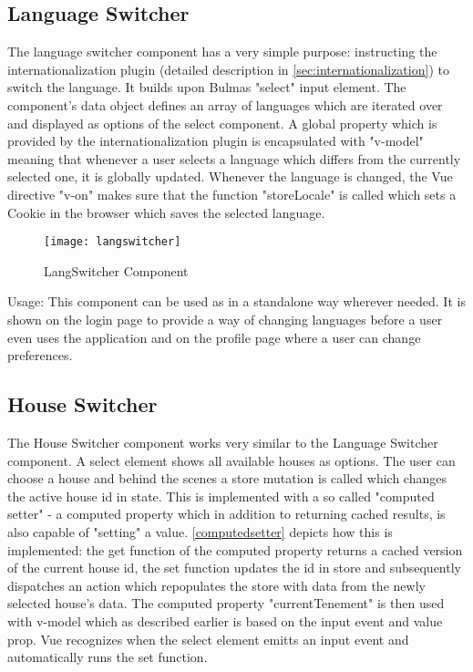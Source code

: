 \subsection{Language Switcher} \label{langswitcher}
The language switcher component has a very simple purpose: instructing the internationalization plugin (detailed description in \autoref{sec:internationalization}) to switch the language. It builds upon Bulmas "select" input element. The component's data object defines an array of languages which are iterated over and displayed as options of the select component. A global property which is provided by the internationalization plugin is encapsulated with "v-model" meaning that whenever a user selects a language which differs from the currently selected one, it is globally updated. Whenever the language is changed, the Vue directive "v-on" makes sure that the function "storeLocale" is called which sets a Cookie in the browser which saves the selected language.

\begin{figure}[H]
  \begin{center}
  \texttt{[image: langswitcher]}
  \end{center}
  \caption{LangSwitcher Component}
  \label{fig:langswitcher}
\end{figure}

Usage: This component can be used as in a standalone way wherever needed. It is shown on the login page to provide a way of changing languages before a user even uses the application and on the profile page where a user can change preferences.


\subsection{House Switcher}
The House Switcher component works very similar to the Language Switcher component. A select element shows all available houses as options. The user can choose a house and behind the scenes a store mutation is called which changes the active house id in state. This is implemented with a so called "computed setter" - a computed property which in addition to returning cached results, is also capable of "setting" a value. \autoref{computedsetter} depicts how this is implemented: the get function of the computed property returns a cached version of the current house id, the set function updates the id in store and subsequently dispatches an action which repopulates the store with data from the newly selected house's data. The computed property "currentTenement" is then used with v-model which as described earlier is based on the input event and value prop. Vue recognizes when the select element emitts an input event and automatically runs the set function. \newline 

